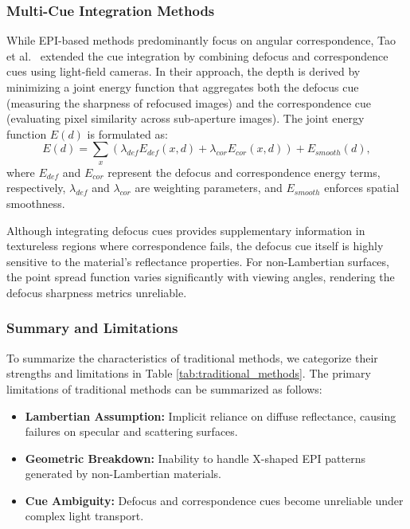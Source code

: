 \subsubsection{Multi-Cue Integration Methods}
While EPI-based methods predominantly focus on angular correspondence, Tao et al.\ \cite{tao2013depth} extended the cue integration by combining defocus and correspondence cues using light-field cameras. In their approach, the depth is derived by minimizing a joint energy function that aggregates both the defocus cue (measuring the sharpness of refocused images) and the correspondence cue (evaluating pixel similarity across sub-aperture images). The joint energy function $E(d)$ is formulated as:
\begin{equation}
E(d) = \sum_{x} \left( \lambda_{def} E_{def}(x, d) + \lambda_{cor} E_{cor}(x, d) \right) + E_{smooth}(d),
\label{eq:ch2_2}
\end{equation}
where $E_{def}$ and $E_{cor}$ represent the defocus and correspondence energy terms, respectively, $\lambda_{def}$ and $\lambda_{cor}$ are weighting parameters, and $E_{smooth}$ enforces spatial smoothness. 

Although integrating defocus cues provides supplementary information in textureless regions where correspondence fails, the defocus cue itself is highly sensitive to the material's reflectance properties. For non-Lambertian surfaces, the point spread function varies significantly with viewing angles, rendering the defocus sharpness metrics unreliable.

\subsubsection{Summary and Limitations}
To summarize the characteristics of traditional methods, we categorize their strengths and limitations in Table \ref{tab:traditional_methods}. The primary limitations of traditional methods can be summarized as follows:
\begin{itemize}
\item \textbf{Lambertian Assumption:} Implicit reliance on diffuse reflectance, causing failures on specular and scattering surfaces.
\item \textbf{Geometric Breakdown:} Inability to handle X-shaped EPI patterns generated by non-Lambertian materials.
\item \textbf{Cue Ambiguity:} Defocus and correspondence cues become unreliable under complex light transport.
\end{itemize}

